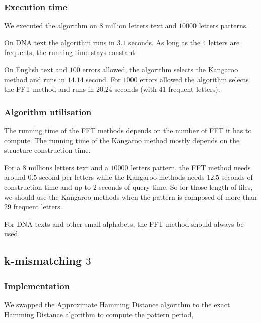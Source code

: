 \documentclass[preprint,12pt]{elsarticle}
\begin{document}
\subsubsection*{Execution time}

We executed the algorithm on $8$ million letters text and $10 000$ letters patterns.

On DNA text the algorithm runs in $3.1$ seconds.
As long as the $4$ letters are frequents, the running time stays constant.

On English text and $100$ errors allowed, the algorithm selects the Kangaroo method and runs in $14.14$ second.
For $1000$ errors allowed the algorithm selects the FFT method and runs in $20.24$ seconds
(with $41$ frequent letters).



\subsubsection*{Algorithm utilisation}
The running time of the FFT methods depends on the number of FFT it has to compute.
The running time of the Kangaroo method mostly depends on the structure construction time.

For a $8$ millions letters text and a $10 000$ letters pattern,
the FFT method needs around $0.5$ second per letters
while the Kangaroo methods needs $12.5$ seconds of construction time
and up to $2$ seconds of query time.
So for those length of files, we should use the Kangaroo methods
when the pattern is composed of more than $29$ frequent letters.

For DNA texts and other small alphabets, the FFT method should always be used.





\subsection{k-mismatching $3$}

\subsubsection*{Implementation}
We swapped the Approximate Hamming Distance algorithm 
to the exact Hamming Distance algorithm
to compute the pattern period,


\end{document}
